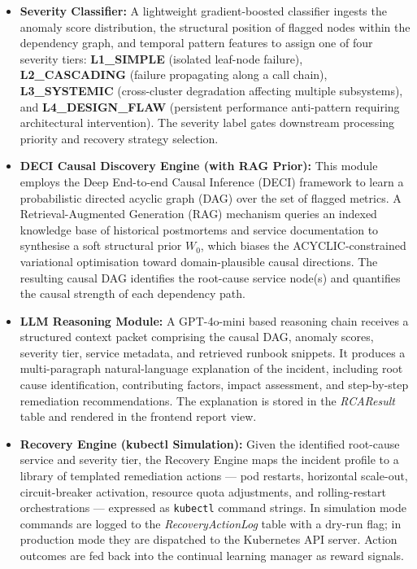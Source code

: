 \begin{itemize}
    \item \textbf{Severity Classifier:}
    A lightweight gradient-boosted classifier ingests the anomaly score distribution, the structural position of flagged nodes within the dependency graph, and temporal pattern features to assign one of four severity tiers: \textbf{L1\_SIMPLE} (isolated leaf-node failure), \textbf{L2\_CASCADING} (failure propagating along a call chain), \textbf{L3\_SYSTEMIC} (cross-cluster degradation affecting multiple subsystems), and \textbf{L4\_DESIGN\_FLAW} (persistent performance anti-pattern requiring architectural intervention). The severity label gates downstream processing priority and recovery strategy selection.

    \item \textbf{DECI Causal Discovery Engine (with RAG Prior):}
    This module employs the Deep End-to-end Causal Inference (DECI) framework to learn a probabilistic directed acyclic graph (DAG) over the set of flagged metrics. A Retrieval-Augmented Generation (RAG) mechanism queries an indexed knowledge base of historical postmortems and service documentation to synthesise a soft structural prior $W_0$, which biases the ACYCLIC-constrained variational optimisation toward domain-plausible causal directions. The resulting causal DAG identifies the root-cause service node(s) and quantifies the causal strength of each dependency path.

    \item \textbf{LLM Reasoning Module:}
    A GPT-4o-mini based reasoning chain receives a structured context packet comprising the causal DAG, anomaly scores, severity tier, service metadata, and retrieved runbook snippets. It produces a multi-paragraph natural-language explanation of the incident, including root cause identification, contributing factors, impact assessment, and step-by-step remediation recommendations. The explanation is stored in the \textit{RCAResult} table and rendered in the frontend report view.

    \item \textbf{Recovery Engine (kubectl Simulation):}
    Given the identified root-cause service and severity tier, the Recovery Engine maps the incident profile to a library of templated remediation actions — pod restarts, horizontal scale-out, circuit-breaker activation, resource quota adjustments, and rolling-restart orchestrations — expressed as \texttt{kubectl} command strings. In simulation mode commands are logged to the \textit{RecoveryActionLog} table with a dry-run flag; in production mode they are dispatched to the Kubernetes API server. Action outcomes are fed back into the continual learning manager as reward signals.


\end{itemize}
